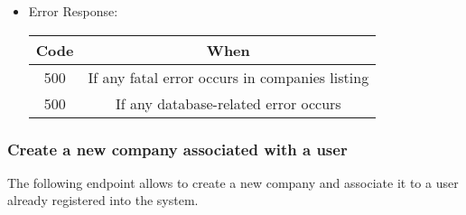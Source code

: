 \begin{itemize}
    \item Error Response:
    \begin{table}[!h]
    \centering
    \begin{tabular}{|c|c|}
    \hline
    \multicolumn{1}{|c|}{\textbf{Code}} & \multicolumn{1}{c|}{\textbf{When}} \\ \hline
    500 & If any fatal error occurs in companies listing \\\hline
    500 & If any database-related error occurs \\\hline
    \end{tabular}
    \end{table}

\end{itemize}


\newpage
\subsubsection*{Create a new company associated with a user}

The following endpoint allows to create a new company and associate it to a user already registered into the system.

